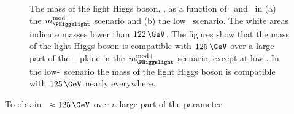 \begin{figure}[h!]
\begin{center}
\end{center}
\caption[The mass of the light Higgs boson, \mh, as a function of \mA~and
\tanb~in the $m_{\PHiggslight}^{\text{mod+}}$ scenario and the low-\tanb~scenario.]{The mass of the light Higgs boson, \mh, as a function 
of \mA~and \tanb~in (a) the $m_{\PHiggslight}^{\text{mod+}}$ scenario and (b) the low \tanb~scenario. The white areas
indicate masses lower than $122\,\GeV$. The figures show that
the mass of the light Higgs boson is compatible with $125\,\GeV$ over a large
part of the \mA-\tanb~plane in the $m_{\PHiggslight}^{\text{mod+}}$ scenario, except at low \tanb. In the low-\tanb~scenario
the mass of the light Higgs boson is compatible with $125\,\GeV$ nearly everywhere.}
\label{fig:mhmodp_mh}
\end{figure}
To obtain \mh~$\approx125\,\GeV$ over a large part of the parameter
